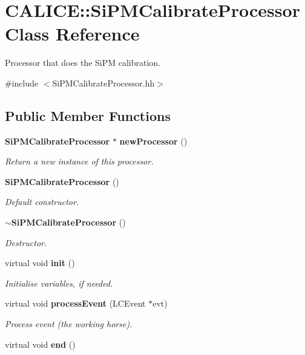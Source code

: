 \section{CALICE::SiPMCalibrateProcessor Class Reference}
\label{classCALICE_1_1SiPMCalibrateProcessor}


Processor that does the SiPM calibration.  


{\ttfamily \#include $<$SiPMCalibrateProcessor.hh$>$}\subsection*{Public Member Functions}
\begin{DoxyCompactItemize}
\item 
{\bf SiPMCalibrateProcessor} $\ast$ {\bf newProcessor} ()\label{classCALICE_1_1SiPMCalibrateProcessor_afcf5d46a36704ca28d4b396e3c6c880c}

\begin{DoxyCompactList}\small\item\em Return a new instance of this processor. \item\end{DoxyCompactList}\item 
{\bf SiPMCalibrateProcessor} ()\label{classCALICE_1_1SiPMCalibrateProcessor_a3bb0d0e2676910428b75c7b8b80ec87a}

\begin{DoxyCompactList}\small\item\em Default constructor. \item\end{DoxyCompactList}\item 
{\bf $\sim$SiPMCalibrateProcessor} ()\label{classCALICE_1_1SiPMCalibrateProcessor_a428372dc991fcf2593166951c3f0365c}

\begin{DoxyCompactList}\small\item\em Destructor. \item\end{DoxyCompactList}\item 
virtual void {\bf init} ()\label{classCALICE_1_1SiPMCalibrateProcessor_aab2cba3af1a694e91a0574ffe20275c7}

\begin{DoxyCompactList}\small\item\em Initialise variables, if needed. \item\end{DoxyCompactList}\item 
virtual void {\bf processEvent} (LCEvent $\ast$evt)
\begin{DoxyCompactList}\small\item\em Process event (the working horse). \item\end{DoxyCompactList}\item 
virtual void {\bf end} ()\label{classCALICE_1_1SiPMCalibrateProcessor_a29f890dd2812216940bc4e4a1534da3d}


\end{DoxyCompactItemize}
